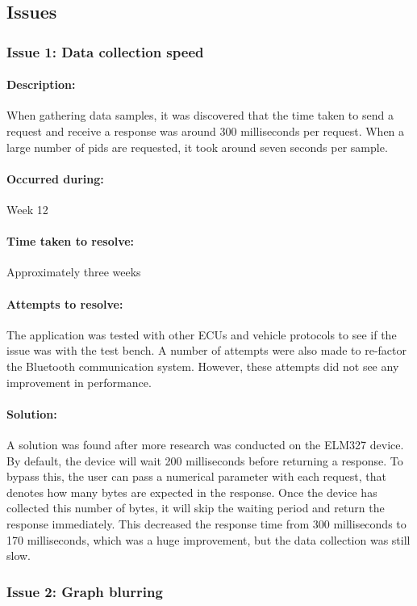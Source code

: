 	\subsection{Issues}{		
		\subsubsection{Issue 1: Data collection speed}{
			\paragraph{Description:}
			When gathering data samples, it was discovered that the time taken to send a request and receive a response was around 300 milliseconds per request. When a large number of pids are requested, it took around seven seconds per sample.
			\paragraph{Occurred during:}
			Week 12
			\paragraph{Time taken to resolve:}
			Approximately three weeks
			\paragraph{Attempts to resolve:}
			The application was tested with other ECUs and vehicle protocols to see if the issue was with the test bench. A number of attempts were also made to re-factor the Bluetooth communication system. However, these attempts did not see any improvement in performance.
			\paragraph{Solution:}
			A solution was found after more research was conducted on the ELM327 device. By default, the device will wait 200 milliseconds before returning a response. To bypass this, the user can pass a numerical parameter with each request, that denotes how many bytes are expected in the response. Once the device has collected this number of bytes, it will skip the waiting period and return the response immediately. This decreased the response time from 300 milliseconds to 170 milliseconds, which was a huge improvement, but the data collection was still slow.
		\subsubsection{Issue 2: Graph blurring}{
}}}
